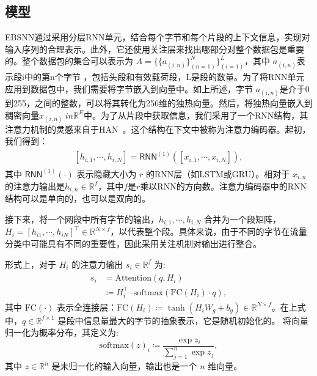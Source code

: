 \documentclass[degree=master,cjk-font=noto]{thuthesis}
\begin{document}
\subsection{模型}
\label{model}

EBSNN通过采用分层RNN单元，结合每个字节和每个片段的上下文信息，实现对输入序列的合理表示。此外，它还使用关注层来找出哪部分对整个数据包是重要的。整个数据包的集合可以表示为 $A=\{\{a_{(i,n)} \}_{(n=1)}^N \}_{(i=1)}^L$，其中 $a_{(i,n)}$表示段i中的第n个字节 ，包括头段和有效载荷段，L是段的数量。为了将RNN单元应用到数据包中，我们需要将字节嵌入到向量中。如上所述，字节 $a_{(i,n)}$是介于0到255，之间的整数，可以将其转化为256维的独热向量。然后，将独热向量嵌入到稠密向量$x_{(i,n)}\ in \mathbb{R}^E$中。为了从片段中获取信息，我们采用了一个RNN结构，其注意力机制的灵感来自于HAN~\cite{b29}。这个结构在下文中被称为注意力编码器。起初，我们得到：
\begin{align}
	\begin{split}
		[h_{i,1}, \cdots, h_{i,N}] = \textsf{RNN}^{(1)}([x_{i,1}, \cdots, x_{i,N}]),
	\end{split}
\end{align}
其中 $\textsf{RNN}^{(1)}(\cdot)$ 表示隐藏大小为 $r$ 的RNN层（如LSTM或GRU）。相对于 $x_{i,n}$ 的注意力输出是$h_{i,n} \in \mathbb{R}^{f}$，其中$f$是$r$乘以RNN的方向数。注意力编码器中的RNN结构可以是单向的，也可以是双向的。

接下来，将一个网段中所有字节的输出，$h_{i,1}, \cdots, h_{i,N}$ 合并为一个段矩阵，$H_i  = [h_{i1}, \cdots, h_{iN}]^\top \in \mathbb{R}^{N \times f}$，以代表整个段。具体来说，由于不同的字节在流量分类中可能具有不同的重要性，因此采用关注机制对输出进行整合。

形式上，对于 $H_i$ 的注意力输出 $s_i \in \mathbb{R}^f$ 为:
\begin{align}
	\begin{split}
		s_i &= \text{Attention}(q, H_i) \\
		&\coloneqq H_i^\top \cdot \text{softmax}(\text{FC}(H_i) \cdot q),
	\end{split}
	\label{attention_encoder}
\end{align}
其中 $\text{FC}(\cdot)$ 表示全连接层：$\text{FC}(H_i) \coloneqq \tanh(H_i W_g + b_g) \in \mathbb{R}^{N \times f}$。在上式中，$q \in \mathbb{R}^{f \times 1}$ 是段中信息量最大的字节的抽象表示，它是随机初始化的。 将向量归一化为概率分布，其定义为:
\begin{equation}
	\text{softmax}(z)_i \coloneqq \frac{\exp{z_i}}{\sum_{j=1}^n \exp{z_j}},
\end{equation}
其中 $z \in \mathbb{R}^n$ 是未归一化的输入向量，输出也是一个 $n$ 维向量。
\end{document}
